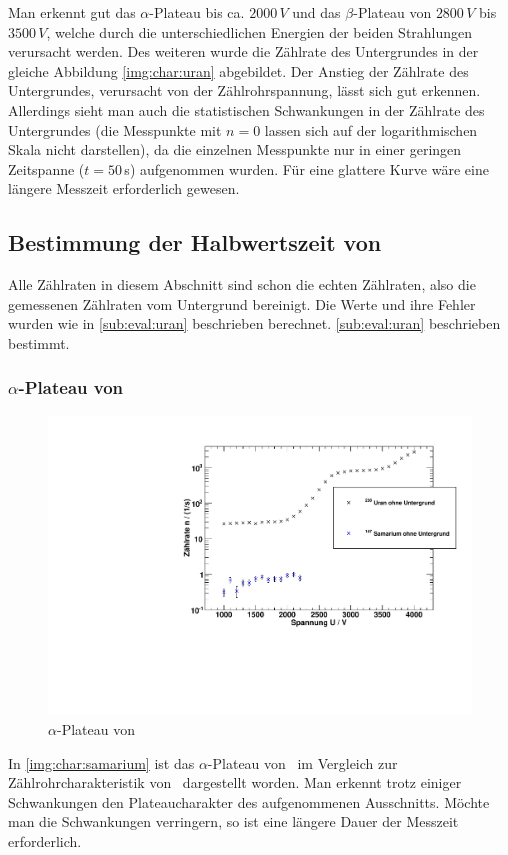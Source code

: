 Man erkennt gut das $\alpha$-Plateau bis ca. $2000\,V$ und das $\beta$-Plateau von $2800\,V$ bis $3500\,V$, welche durch die 
unterschiedlichen Energien der beiden Strahlungen verursacht werden. Des weiteren wurde die Zählrate des Untergrundes in der gleiche Abbildung 
\ref{img:char:uran} abgebildet. Der Anstieg der Zählrate des Untergrundes, verursacht von der Zählrohrspannung, lässt sich gut erkennen. Allerdings 
sieht man auch die statistischen Schwankungen in der Zählrate des Untergrundes (die Messpunkte mit $n = 0 $ lassen sich auf der logarithmischen 
Skala nicht darstellen), da die einzelnen Messpunkte nur in einer geringen Zeitspanne ($t=50\,$s) aufgenommen wurden. Für eine glattere Kurve wäre 
eine längere Messzeit erforderlich gewesen.
\subsection{Bestimmung der Halbwertszeit von \samarium}
Alle Zählraten in diesem Abschnitt sind schon die echten Zählraten, also die gemessenen Zählraten vom Untergrund bereinigt. 
Die Werte und ihre Fehler wurden wie in \ref{sub:eval:uran} beschrieben berechnet.
\ref{sub:eval:uran} beschrieben bestimmt.
\subsubsection{$\alpha$-Plateau von \samarium}
\begin{figure}[H]
\begin{center}
  \includegraphics[width=15cm]{../img/Samarium147_Charakteristik.pdf}
  \caption[$\alpha$-Plateau mit \samarium]{$\alpha$-Plateau von \samarium} %
  \label{img:char:samarium}
\end{center}
\end{figure}
In \autoref{img:char:samarium} ist das $\alpha$-Plateau von \samarium\, im Vergleich zur Zählrohrcharakteristik von \uran\, dargestellt worden. 
Man erkennt trotz einiger Schwankungen den Plateaucharakter des aufgenommenen Ausschnitts. Möchte man die Schwankungen verringern, so ist eine 
längere Dauer der Messzeit erforderlich.

